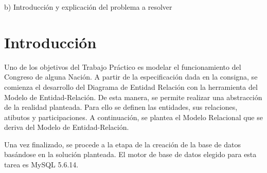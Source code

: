 b) Introducción y explicación del problema a resolver

\section{Introducción}
Uno de los objetivos del Trabajo Práctico es modelar el funcionamiento del Congreso de alguna Nación.
A partir de la especificación dada en la consigna, se comienza el desarrollo del Diagrama de Entidad Relación con la herramienta del Modelo de Entidad-Relación. De esta manera, se permite realizar una abstracción de la realidad planteada. Para ello se definen las entidades, sus relaciones, atibutos y participaciones. 
A continuación, se plantea el Modelo Relacional que se deriva del Modelo de Entidad-Relación. 


Una vez finalizado, se procede a la etapa de la creación de la base de datos basándose en la solución planteada. El motor de base de datos elegido para esta tarea es MySQL 5.6.14.

